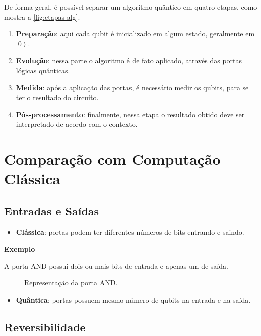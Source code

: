 De forma geral, é possível separar um algoritmo quântico em quatro etapas, como mostra a \autoref{fig:etapas-alg}.

\begin{enumerate}
\tightlist
\item
  \textbf{Preparação}: aqui cada qubit é inicializado em algum estado,
  geralmente em \(\left| 0 \right\rangle\).
\item
  \textbf{Evolução}: nessa parte o algoritmo é de fato aplicado, através
  das portas lógicas quânticas.
\item
  \textbf{Medida}: após a aplicação das portas, é necessário medir os
  qubits, para se ter o resultado do circuito.
\item
  \textbf{Pós-processamento}: finalmente, nessa etapa o resultado obtido
  deve ser interpretado de acordo com o contexto.
\end{enumerate}

\section{Comparação com Computação Clássica}\label{sec:compare}

\subsection{Entradas e Saídas}\label{subsec:entradas-e-saidas}

\begin{itemize}
\tightlist
\item
  \textbf{Clássica}: portas podem ter diferentes números de bits
  entrando e saindo.
\end{itemize}

\textbf{Exemplo}

A porta AND possui dois ou mais bits de entrada e apenas um de saída.

\begin{figure}
    \centering
    
    \caption{Representação da porta AND.}
    \label{fig:and}
\end{figure}

\begin{itemize}
\tightlist
\item
  \textbf{Quântica}: portas possuem mesmo número de qubits na entrada e
  na saída.
\end{itemize}

\subsection{Reversibilidade}\label{subsec:reversibilidade}

